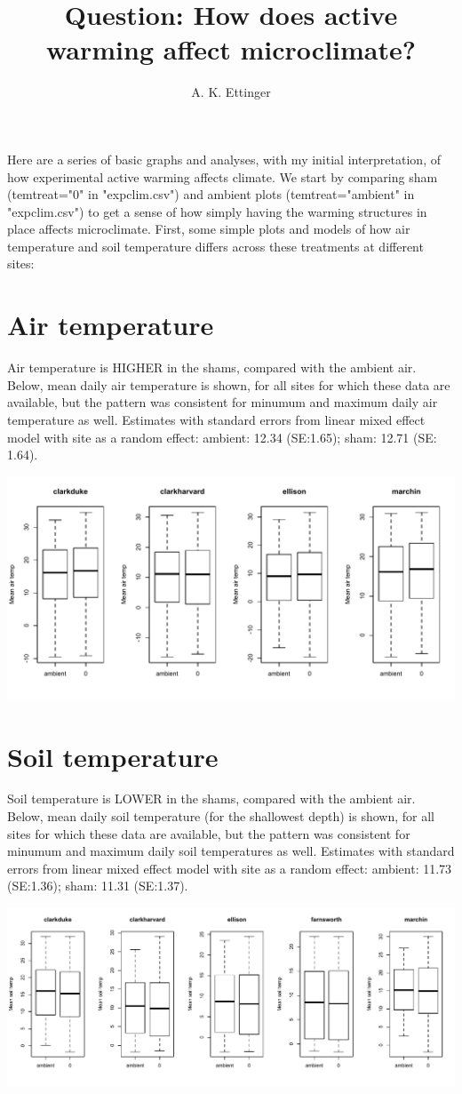 \documentclass{article}
\begin{document}

\title{Question: How does active warming affect microclimate?} %
\author{A. K. Ettinger}
\maketitle  %
Here are a series of basic graphs and analyses, with my initial interpretation, of how experimental active warming affects climate. We start by comparing sham (temtreat="0" in "expclim.csv") and  ambient plots (temtreat="ambient" in "expclim.csv") to get a sense of how simply having the warming structures in place affects microclimate. 
First, some simple plots and models of how air temperature and soil temperature differs across these treatments at different sites:
\section {Air temperature}
Air temperature is HIGHER in the shams, compared with the ambient air. Below, mean daily air temperature is shown, for all sites for which these data are available, but the pattern was consistent for minumum and maximum daily air temperature as well. Estimates with standard errors from linear mixed effect model with site as a random effect: ambient: 12.34 (SE:1.65); sham: 12.71 (SE: 1.64).

\includegraphics{Analyses/output/shamvambient_airtemp.pdf}

\section {Soil temperature}
Soil temperature is LOWER in the shams, compared with the ambient air. Below, mean daily soil temperature (for the shallowest depth) is shown, for all sites for which these data are available, but the pattern was consistent for minumum and maximum daily soil temperatures as well. Estimates with standard errors from linear mixed effect model with site as a random effect: ambient: 11.73 (SE:1.36); sham: 11.31 (SE:1.37).

\includegraphics{Analyses/output/shamvambient_soiltemp.pdf}
\end{document}
